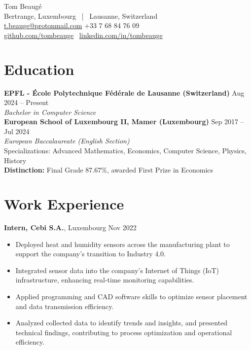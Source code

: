 \documentclass[10pt, letterpaper]{article}
\newenvironment{highlights}{
    \begin{itemize}[topsep=0.10cm, parsep=0.10cm, partopsep=0pt, itemsep=0pt, leftmargin=10pt]
}{
    \end{itemize}
}
\begin{document}
\begin{center}
    {\LARGE Tom Beaug\'e} \\[5pt]
    Bertrange, Luxembourg \ | \ Lausanne, Switzerland \\
    \href{mailto:t.beauge@protonmail.com}{t.beauge@protonmail.com} \quad
    +33 7 68 84 76 09 \\
    \href{https://github.com/tombeauge}{github.com/tombeauge} \
    \href{https://www.linkedin.com/in/tombeauge/}{linkedin.com/in/tombeauge}
\end{center}

\section{Education}
\textbf{EPFL - École Polytechnique Fédérale de Lausanne (Switzerland)} \hfill Aug 2024 -- Present \\
\textit{Bachelor in Computer Science} \\[5pt]

\textbf{European School of Luxembourg II, Mamer (Luxembourg)} \hfill Sep 2017 -- Jul 2024 \\
\textit{European Baccalaureate (English Section)} \\ 
Specializations: Advanced Mathematics, Economics, Computer Science, Physics, History \\[3pt]
\textbf{Distinction:} Final Grade 87.67\%, awarded First Prize in Economics

\section{Work Experience}

\textbf{Intern, Cebi S.A.}, Luxembourg \hfill Nov 2022 \\
\begin{highlights}
    \item Deployed heat and humidity sensors across the manufacturing plant to support the company’s transition to Industry 4.0.
    \item Integrated sensor data into the company’s Internet of Things (IoT) infrastructure, enhancing real-time monitoring capabilities.
    \item Applied programming and CAD software skills to optimize sensor placement and data transmission efficiency.
    \item Analyzed collected data to identify trends and insights, and presented technical findings, contributing to process optimization and operational efficiency.
\end{highlights}
\end{document}
